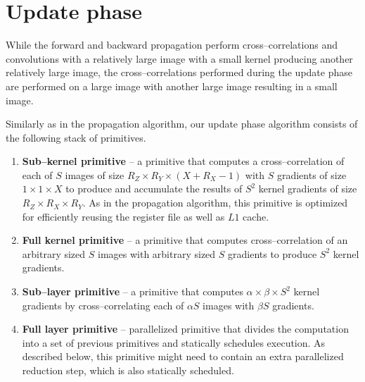 \section{Update phase}

  While the forward and backward propagation perform
  cross--correlations and convolutions with a relatively large image
  with a small kernel producing another relatively large image, the
  cross--correlations performed during the update phase are performed
  on a large image with another large image resulting in a small
  image.

  Similarly as in the propagation algorithm, our update phase algorithm
  consists of the following stack of primitives.

  \begin{enumerate}
    \item {\bf Sub--kernel primitive} -- a primitive that computes a
      cross--correlation of each of $S$ images of size $R_Z \times R_Y
      \times (X + R_X - 1)$ with $S$ gradients of size $1 \times 1
      \times X$ to produce and accumulate the results of $S^2$ kernel
      gradients of size $R_Z \times R_X \times R_Y$.  As in the
      propagation algorithm, this primitive is optimized for efficiently
      reusing the register file as well as $L1$ cache.
    \item {\bf Full kernel primitive} -- a primitive that computes
      cross--correlation of an arbitrary sized $S$ images with
      arbitrary sized $S$ gradients to produce $S^2$ kernel gradients.
    \item {\bf Sub--layer primitive} -- a primitive that computes
      $\alpha \times \beta \times S^2$ kernel gradients by
      cross--correlating each of $\alpha S$ images with $\beta S$
      gradients.
    \item {\bf Full layer primitive} -- parallelized primitive that
      divides the computation into a set of previous primitives and
      statically schedules execution.  As described below, this
      primitive might need to contain an extra parallelized reduction
      step, which is also statically scheduled.
  \end{enumerate}


